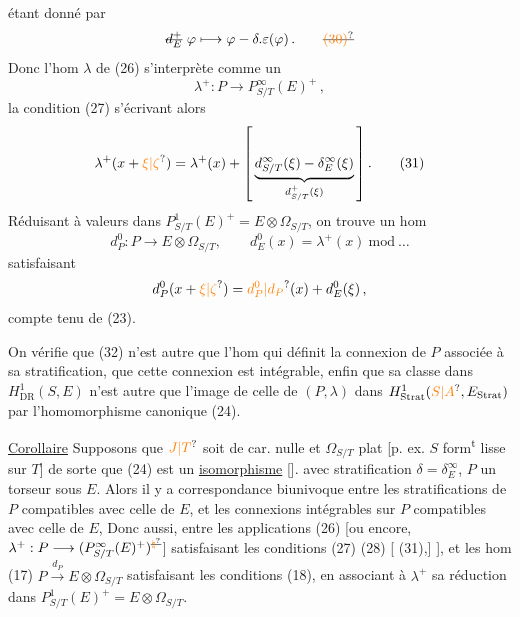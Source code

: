 
étant donné par
\[
 \deleted{d^+_E}\ \varphi\longmapsto\varphi-\delta.\varepsilon(\varphi)\,. \tag*{\deleted{\unsure{(30)}}}
\]
Donc l'hom $\lambda$ de (26) s'interprète comme un
\[
 \lambda^+:P\longrightarrow P^\infty_{S/T}(E)^+ \,, \tag*{(30)}
\]
 la condition (27) s'écrivant alors
\[
 \lambda^+(x+\unsure{\xi|\zeta})=\lambda^+(x)+\left[\,\underbrace{d^\infty_{S/T}(\xi)-\delta^\infty_E(\xi)}_{d^+_{S/T}(\xi)}\,\right]. \tag*{(31)}
\]
Réduisant à valeurs dans $P^1_{S/T}(E)^+=E\otimes\Omega_{S/T}$, on trouve un hom
\[
 d^0_P:P\longrightarrow E\otimes\Omega_{S/T},\qquad d^0_E(x)=\lambda^+(x)\ \mathrm{mod}\ \ldots \tag*{(32)}
\]
satisfaisant
\[
 d^0_P(x+\unsure{\xi|\zeta})=\unsure{d^0_P|d_P}(x)+d^0_E(\xi)\,,
\]
compte tenu de (23).

On vérifie que (32) n'est autre que l'hom qui définit la connexion de $P$ associée à sa stratification,  que cette connexion est intégrable, enfin que sa classe dans $H^1_{\mathrm{DR}}(S,E)$ n'est autre que l'image de celle de  $(P,\lambda)$ dans $H^1_{\mathrm{Strat}}(\unsure{S|A},E_{\mathrm{Strat}})$ par l'homomorphisme canonique (24).

\uline{Corollaire} Supposons que $\unsure{J|T}$ soit de car. nulle et $\Omega_{S/T}$ plat [p. ex. $S$ form\textsuperscript{t} lisse sur $T$] de sorte que (24) est un \uline{isomorphisme} [\enspace].     avec stratification $\delta=\delta^\infty_E$, $P$ un torseur sous $E$. Alors il y a correspondance biunivoque entre les stratifications de $P$ compatibles avec celle de $E$, et les connexions intégrables sur $P$ compatibles avec celle de $E$,
Donc aussi, entre les applications (26)   [ou encore, $\lambda^+:P\longrightarrow (P^\infty_{S/T}(E)^+)^{\deleted{\unsure{\natural}}}$] satisfaisant les conditions (27) (28) [ (31),]  
], et les hom (17) $P\xrightarrow{d_P}E\otimes\Omega_{S/T}$ satisfaisant les conditions (18), en associant à $\lambda^+$ sa réduction dans $P^1_{S/T}(E)^+=E\otimes\Omega_{S/T}$.

